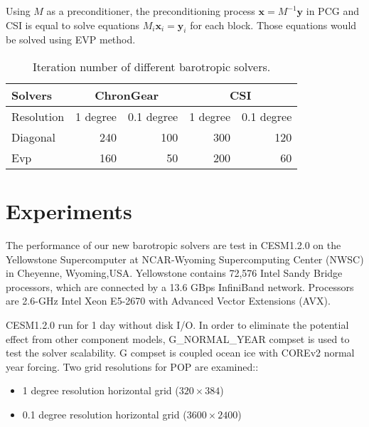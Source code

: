 \documentclass{sig-alternate}
\begin{document}
Using $M$ as a preconditioner, the preconditioning process $\textbf{x} = M^{-1}\textbf{y}$ in PCG and CSI is equal to solve equations $M_i \textbf{x}_i = \textbf{y}_i$ for each block. 
Those equations would be solved using EVP method. 

\begin{table}
\centering
\caption{Iteration number of different barotropic solvers. \label{tab:iteration_evp}}
\begin{tabular}{|l|r|r|r|r|}
\hline
Solvers & \multicolumn{2}{|c|}{ChronGear} & \multicolumn{2}{|c|}{CSI}\\ \hline
Resolution &  1 degree  & 0.1 degree	& 1 degree  & 0.1 degree\\\hline
Diagonal    &  240  & 100	&300 & 120\\\hline
Evp         & 160   & 50	&200 & 60\\\hline
\end{tabular}
\end{table}



\section{Experiments} \label{se:exp}

The performance of our new barotropic solvers are test in CESM1.2.0 on the Yellowstone Supercomputer at NCAR-Wyoming Supercomputing Center (NWSC) in Cheyenne, Wyoming,USA.  
Yellowstone contains 72,576 Intel Sandy Bridge processors, which are connected by a 13.6 GBps InfiniBand network. Processors are 2.6-GHz Intel Xeon E5-2670 with Advanced Vector Extensions (AVX). 

CESM1.2.0 run for 1 day without disk I/O. In order to eliminate the potential effect from other component models, G\_NORMAL\_YEAR compset is used to test the solver scalability. G compset is coupled ocean ice with COREv2 normal year forcing.  
Two grid resolutions for POP are examined:: 

\begin{itemize} 
\item 1 degree resolution horizontal grid ($320\times 384$)
\item 0.1 degree resolution horizontal grid ($3600\times 2400$)
\end{itemize}
\end{document}
